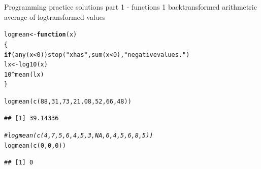 \documentclass[xcolor=table,       handout,    xcolor=dvipsnames]{beamer}\usepackage[]{graphicx}\usepackage[]{color}
\makeatletter
\newcommand{\hlnum}[1]{\textcolor[rgb]{0,0,0}{#1}}
\newcommand{\hlstr}[1]{\textcolor[rgb]{0.545,0.137,0.137}{#1}}
\newcommand{\hlcom}[1]{\textcolor[rgb]{0,0.392,0}{\textit{#1}}}
\newcommand{\hlopt}[1]{\textcolor[rgb]{0,0,0}{#1}}
\newcommand{\hlstd}[1]{\textcolor[rgb]{0,0,0}{#1}}
\newcommand{\hlkwa}[1]{\textcolor[rgb]{1,0,0}{\textbf{#1}}}
\newcommand{\hlkwb}[1]{\textcolor[rgb]{0,0,0}{#1}}
\newcommand{\hlkwc}[1]{\textcolor[rgb]{1,0,1}{#1}}
\newcommand{\hlkwd}[1]{\textcolor[rgb]{0,0,1}{#1}}
\newenvironment{kframe}{%
 \def\at@end@of@kframe{}%
 \ifinner\ifhmode%
  \def\at@end@of@kframe{\end{minipage}}%
  \begin{minipage}{\columnwidth}%
 \fi\fi%
 \def\FrameCommand##1{\hskip\@totalleftmargin \hskip-\fboxsep
 \colorbox{shadecolor}{##1}\hskip-\fboxsep
     \hskip-\linewidth \hskip-\@totalleftmargin \hskip\columnwidth}%
 \MakeFramed {\advance\hsize-\width
   \@totalleftmargin\z@ \linewidth\hsize
   \@setminipage}}%
 {\par\unskip\endMakeFramed%
 \at@end@of@kframe}
\newenvironment{knitrout}{}{} %
\makeatother
\begin{document}
\begin{frame}[fragile]{Programming practice solutions part 1 - functions 1}
backtransformed arithmetric average of logtransformed values
\begin{knitrout}
\color{fgcolor}\begin{kframe}
\begin{alltt}
\hlstd{logmean} \hlkwb{<-} \hlkwa{function}\hlstd{(}\hlkwc{x}\hlstd{)}
  \hlstd{\{}
  \hlkwa{if}\hlstd{(}\hlkwd{any}\hlstd{(x}\hlopt{<}\hlnum{0}\hlstd{))} \hlkwd{stop}\hlstd{(}\hlstr{"x has "}\hlstd{,} \hlkwd{sum}\hlstd{(x}\hlopt{<}\hlnum{0}\hlstd{),} \hlstr{" negative values."}\hlstd{)}
  \hlstd{lx} \hlkwb{<-} \hlkwd{log10}\hlstd{(x)}
  \hlnum{10}\hlopt{^}\hlkwd{mean}\hlstd{(lx)}
  \hlstd{\}}

\hlkwd{logmean}\hlstd{(}\hlkwd{c}\hlstd{(}\hlnum{88}\hlstd{,}\hlnum{31}\hlstd{,}\hlnum{73}\hlstd{,}\hlnum{21}\hlstd{,}\hlnum{08}\hlstd{,}\hlnum{52}\hlstd{,}\hlnum{66}\hlstd{,}\hlnum{48}\hlstd{))}
\end{alltt}
\begin{verbatim}
## [1] 39.14336
\end{verbatim}
\begin{alltt}
\hlcom{#logmean(c(4,7,5,6,4,5,3,NA,6,4,5,6,8,5))}
\hlkwd{logmean}\hlstd{(}\hlkwd{c}\hlstd{(}\hlnum{0}\hlstd{,}\hlnum{0}\hlstd{,}\hlnum{0}\hlstd{))}
\end{alltt}
\begin{verbatim}
## [1] 0
\end{verbatim}
\end{kframe}
\end{knitrout}

\end{frame}

\end{document}
